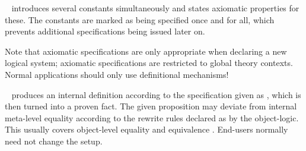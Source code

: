 \begin{isabellebody}
\begin{isamarkuptext}
  \begin{description}
  
  \item \hyperlink{command.axiomatization}{\mbox{}}~
  introduces several constants simultaneously and states axiomatic
  properties for these.  The constants are marked as being specified
  once and for all, which prevents additional specifications being
  issued later on.
  
  Note that axiomatic specifications are only appropriate when
  declaring a new logical system; axiomatic specifications are
  restricted to global theory contexts.  Normal applications should
  only use definitional mechanisms!

  \item \hyperlink{command.definition}{\mbox{}}~ produces an
  internal definition  according to the specification
  given as , which is then turned into a proven fact.  The
  given proposition may deviate from internal meta-level equality
  according to the rewrite rules declared as \hyperlink{attribute.defn}{\mbox{}} by the
  object-logic.  This usually covers object-level equality  and equivalence .  End-users normally need not
  change the \hyperlink{attribute.defn}{\mbox{}} setup.
  

\end{description}
\end{isamarkuptext}
\end{isabellebody}
